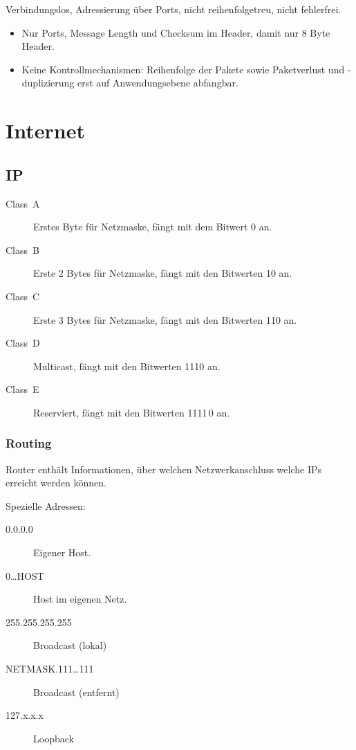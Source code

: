 Verbindungslos, Adressierung über Ports, nicht reihenfolgetreu, nicht fehlerfrei.
\begin{itemize}
\item Nur Ports, Message Length und Checksum im Header, damit nur 8 Byte Header.
\item Keine Kontrollmechanismen: Reihenfolge der Pakete sowie Paketverlust und -duplizierung erst auf Anwendungsebene abfangbar.
\end{itemize}

\chapter{Internet}


\section{IP}
\begin{description}
\item [{Class~A}] Erstes Byte für Netzmaske, fängt mit dem Bitwert 0 an.
\item [{Class~B}] Erste 2 Bytes für Netzmaske, fängt mit den Bitwerten 10 an.
\item [{Class~C}] Erste 3 Bytes für Netzmaske, fängt mit den Bitwerten 110 an.
\item [{Class~D}] Multicast, fängt mit den Bitwerten 1110 an.
\item [{Class~E}] Reserviert, fängt mit den Bitwerten 1111\,0 an.
\end{description}

\subsection{Routing}

Router enthält Informationen, über welchen Netzwerkanschluss welche IPs erreicht werden können.

Spezielle Adressen:
\begin{description}
\item [{0.0.0.0}] Eigener Host.
\item [{0\ldots{}HOST}] Host im eigenen Netz.
\item [{255.255.255.255}] Broadcast (lokal)
\item [{NETMASK.111\ldots{}111}] Broadcast (entfernt)
\item [{127.x.x.x}] Loopback
\end{description}

